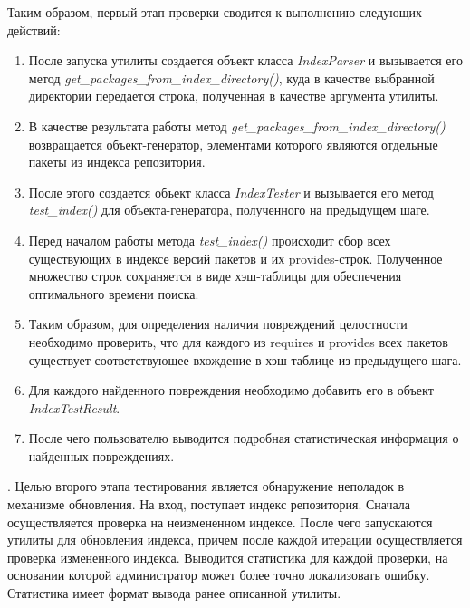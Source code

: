 \documentclass[a4paper]{article}
\begin{document}
Таким образом, первый этап проверки сводится к выполнению следующих действий:

\begin{enumerate}
\item
После запуска утилиты создается объект класса \textit{IndexParser} и вызывается его метод
\textit{get\_packages\_from\_index\_directory()}, куда в качестве выбранной
директории передается строка, полученная в качестве аргумента утилиты.

\item
В качестве результата работы метод \textit{get\_packages\_from\_index\_directory()}
возвращается объект-генератор, элементами которого являются отдельные пакеты из индекса 
репозитория.

\item
После этого создается объект класса \textit{IndexTester} и вызывается его метод
\textit{test\_index()} для объекта-генератора, полученного на предыдущем шаге.

\item
Перед началом работы метода \textit{test\_index()} происходит сбор всех существующих
в индексе версий пакетов и их provides-строк. Полученное множество строк сохраняется
в виде хэш-таблицы для обеспечения оптимального времени поиска.

\item
Таким образом, для определения наличия повреждений целостности
необходимо проверить, что для каждого из requires и provides всех пакетов
существует соответствующее вхождение в хэш-таблице из предыдущего шага.

\item 
Для каждого найденного повреждения необходимо добавить его в объект \textit{IndexTestResult}.

\item
После чего пользователю выводится подробная статистическая информация о найденных повреждениях.

\end{enumerate}
.
\newpage
Целью второго этапа тестирования является обнаружение неполадок в механизме 
обновления. На вход, поступает индекс репозитория. Сначала осуществляется 
проверка на неизмененном индексе. После чего запускаются
утилиты для обновления индекса, причем после каждой итерации осуществляется 
проверка измененного индекса. Выводится статистика для каждой проверки, 
на основании которой администратор может более точно локализовать ошибку.
Статистика имеет формат вывода ранее описанной утилиты.
\end{document}
